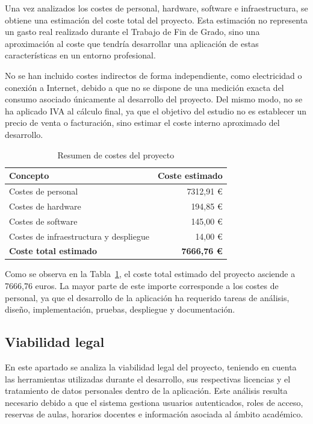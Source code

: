 Una vez analizados los costes de personal, hardware, software e infraestructura, se obtiene una estimación del coste total del proyecto. Esta estimación no representa un gasto real realizado durante el Trabajo de Fin de Grado, sino una aproximación al coste que tendría desarrollar una aplicación de estas características en un entorno profesional.

No se han incluido costes indirectos de forma independiente, como electricidad o conexión a Internet, debido a que no se dispone de una medición exacta del consumo asociado únicamente al desarrollo del proyecto. Del mismo modo, no se ha aplicado IVA al cálculo final, ya que el objetivo del estudio no es establecer un precio de venta o facturación, sino estimar el coste interno aproximado del desarrollo.


\begin{table}[H]
	\centering
	\begin{tabular}{l r}
		\toprule
		\textbf{Concepto} & \textbf{Coste estimado} \\
		\midrule
		Costes de personal & 7312,91 € \\
		Costes de hardware & 194,85 € \\
		Costes de software & 145,00 € \\
		Costes de infraestructura y despliegue & 14,00 € \\
		\midrule
		\textbf{Coste total estimado} & \textbf{7666,76 €} \\
		\bottomrule
	\end{tabular}
	\caption{Resumen de costes del proyecto}
	\label{tab:total}
\end{table}

Como se observa en la Tabla~\ref{tab:total}, el coste total estimado del proyecto asciende a 7666,76 euros. La mayor parte de este importe corresponde a los costes de personal, ya que el desarrollo de la aplicación ha requerido tareas de análisis, diseño, implementación, pruebas, despliegue y documentación.

\subsection{Viabilidad legal}

En este apartado se analiza la viabilidad legal del proyecto, teniendo en cuenta las herramientas utilizadas durante el desarrollo, sus respectivas licencias y el tratamiento de datos personales dentro de la aplicación. Este análisis resulta necesario debido a que el sistema gestiona usuarios autenticados, roles de acceso, reservas de aulas, horarios docentes e información asociada al ámbito académico.

